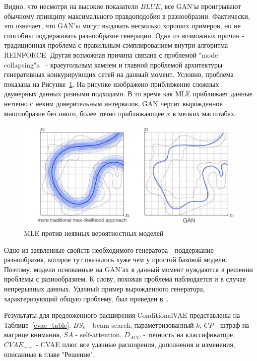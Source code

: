 \documentclass{spbau-diploma}
\begin{document}
Видно, что несмотря на высокие показатели $BLUE$, все GAN'ы проигрывают 
обычному принципу максимального правдоподобия в разнообразии. Фактически, это
означает, что GAN'ы могут выдавать несколько хороших примеров, но не способны
поддерживать разнообразие генерации. Одна из возможных причин - традиционная 
проблема с правильным сэмплированием внутри алгоритма REINFORCE. Другая 
возможная причина связана с проблемой 
"mode collapsing"a~\cite{mode_collapsing} - краеугольным камнем и главной 
проблемой архитектуры генеративных конкурирующих сетей на данный момент. 
Условно, проблема показана на Рисунке~\ref{ml_vs_gan}. На рисунке изображено 
приближение сложных двумерных данных разными подходами. В то время как MLE 
приближает данные неточно с неким доверительным интервалов, GAN чертит 
вырожденное многообразие без оного, более точно приближающее $x$ в мелких 
масштабах.

\begin{figure}
\centering
\includegraphics[width=\textwidth]{images/ml_vs_gan.png}
\caption{MLE против неявных вероятностных моделей}
\label{ml_vs_gan}
\end{figure}

Одно из заявленные свойств необходимого генератора - поддержание разнообразия, 
которое тут оказалось хуже чем у простой базовой модели. Поэтому, модели 
основанные на GAN'ах в данный момент нуждаются в решении проблемы с 
разнообразием. К слову, похожая проблема наблюдается и в случае непрерывных 
данных. Удачный пример вырожденного генератора, характеризующий общую проблему,
был приведен в~\cite{vetrovgan}.

Результаты для предложенного расширения ConditionalVAE представлены на 
Таблице~\ref{cvae_table}. $BS_k$ - beam search, параметризованный $k$, $CP$ - 
штраф на матрице внимания, $SA$ - self-attention. $D_{ACC}$ - точность на 
классификаторе, $CVAE_{++}$ - CVAE плюс все удачные расширения, дополнения и 
изменения, описанные в главе "Решение".
\end{document}
